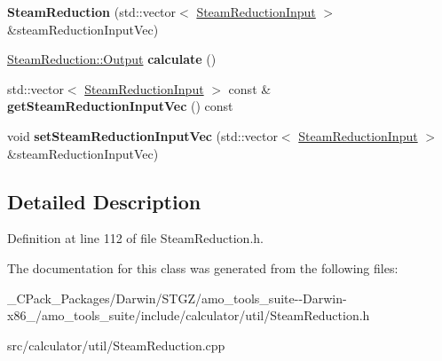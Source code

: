 \begin{DoxyCompactItemize}
\item 
\mbox{\label{class_steam_reduction_a426f4bcc997f18ebee62301abbb1c27e}} 
{\bfseries Steam\+Reduction} (std\+::vector$<$ \hyperlink{class_steam_reduction_input}{Steam\+Reduction\+Input} $>$ \&steam\+Reduction\+Input\+Vec)
\item 
\mbox{\label{class_steam_reduction_a2a6c79eb2648c94afae6c75719cab193}} 
\hyperlink{struct_steam_reduction_1_1_output}{Steam\+Reduction\+::\+Output} {\bfseries calculate} ()
\item 
\mbox{\label{class_steam_reduction_a7862d7d3c48a19cd7ebc68f3e9cbc666}} 
std\+::vector$<$ \hyperlink{class_steam_reduction_input}{Steam\+Reduction\+Input} $>$ const  \& {\bfseries get\+Steam\+Reduction\+Input\+Vec} () const
\item 
\mbox{\label{class_steam_reduction_a872bcd8a94eb663b6e5f1877e7b2f0f2}} 
void {\bfseries set\+Steam\+Reduction\+Input\+Vec} (std\+::vector$<$ \hyperlink{class_steam_reduction_input}{Steam\+Reduction\+Input} $>$ \&steam\+Reduction\+Input\+Vec)
\end{DoxyCompactItemize}


\subsection{Detailed Description}


Definition at line 112 of file Steam\+Reduction.\+h.



The documentation for this class was generated from the following files\+:\begin{DoxyCompactItemize}
\item 
\+\_\+\+C\+Pack\+\_\+\+Packages/\+Darwin/\+S\+T\+G\+Z/amo\+\_\+tools\+\_\+suite-\/-\/\+Darwin-\/x86\+\_/amo\+\_\+tools\+\_\+suite/include/calculator/util/Steam\+Reduction.\+h\item 
src/calculator/util/Steam\+Reduction.\+cpp\end{DoxyCompactItemize}
